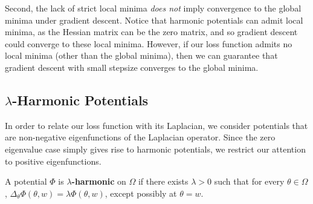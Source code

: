 Second, the lack of strict local minima {\it does not} imply
convergence to the global minima under gradient descent. Notice that
harmonic potentials can admit local minima, as the Hessian matrix can
be the zero matrix, and so gradient descent could converge to these
local minima. However, if our loss function admits no local minima
(other than the global minima), then we can guarantee that gradient
descent with small stepsize converges to the global minima.
\fi

\subsection{$\lambda$-Harmonic Potentials}
\iffalse
The first alternative to harmonic potentials is the natural
consideration of strictly subharmonic potentials, which have a
positive Laplacian value almost everywhere. Subharmonic potentials are
also difficult to realize; however their convergence properties are
more robust than harmonic potentials and are discussed in supplementary material. 
\fi

%
In order to relate our loss function with its Laplacian, we consider potentials that are non-negative eigenfunctions of the Laplacian operator. Since the zero eigenvalue case simply gives rise to harmonic potentials, we restrict our attention to positive eigenfunctions.
%
\begin{definition}
A potential $\Phi$ is {\bf$\lambda$-harmonic} on $\Omega$ if there exists $\lambda > 0$ such that for every $\theta \in \Omega$, $\Delta_\theta \Phi(\theta, w) = \lambda \Phi(\theta,w) $, except possibly at $\theta = w$.
\end{definition}

